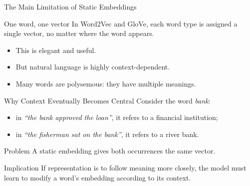 \documentclass[11pt,aspectratio=169,professionalfonts]{beamer}
\begin{document}
%
%
\begin{frame}{The Main Limitation of Static Embeddings}
\begin{alertblock}{One word, one vector}
In Word2Vec and GloVe, each word type is assigned a single vector, no matter where the word appears.
\end{alertblock}

\vspace{0.15cm}
\begin{itemize}
    \item This is elegant and useful.
    \item But natural language is highly context-dependent.
    \item Many words are polysemous: they have multiple meanings.
\end{itemize}
\end{frame}
%
%
\begin{frame}{Why Context Eventually Becomes Central}
Consider the word \textit{bank}:
\begin{itemize}
    \item in \emph{``the bank approved the loan''}, it refers to a financial institution;
    \item in \emph{``the fisherman sat on the bank''}, it refers to a river bank.
\end{itemize}

\vspace{0.2cm}
\begin{block}{Problem}
A static embedding gives both occurrences the same vector.
\end{block}

\vspace{0.15cm}
\begin{alertblock}{Implication}
If representation is to follow meaning more closely, the model must learn to modify a word's embedding according to its context.
\end{alertblock}
\end{frame}
%
%
\end{document}
